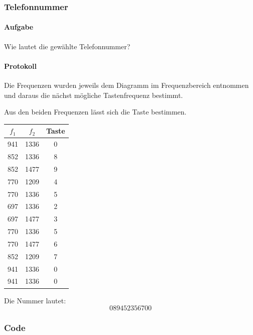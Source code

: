 \documentclass[10pt]{scrreprt}
\begin{document}
        \subsubsection{Telefonnummer}
        \paragraph{Aufgabe}
        Wie lautet die gewählte Telefonnummer?

        \paragraph{Protokoll}
        Die Frequenzen wurden jeweils dem Diagramm im Frequenzbereich entnommen
        und daraus die nächst mögliche Tastenfrequenz bestimmt.

        Aus den beiden Frequenzen lässt sich die Taste bestimmen.
        \begin{center}
            \begin{tabular}{ccc}
                \toprule
                $f_1$ & $f_2$ & Taste \\
                \midrule
                941 & 1336 & 0\\
                852 & 1336 & 8\\
                852 & 1477 & 9\\
                770 & 1209 & 4\\
                770 & 1336 & 5\\
                697 & 1336 & 2\\
                697 & 1477 & 3\\
                770 & 1336 & 5\\
                770 & 1477 & 6\\
                852 & 1209 & 7\\
                941 & 1336 & 0\\
                941 & 1336 & 0\\
                \bottomrule
            \end{tabular}
        \end{center}
        Die Nummer lautet:
        \begin{equation*}
            089452356700
        \end{equation*}



        \subsubsection{Code}
\end{document}
